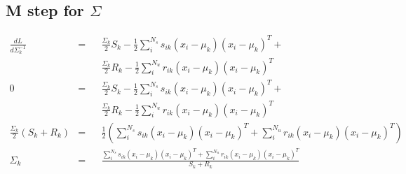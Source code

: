 \documentclass[11pt]{article}
\begin{document}
\subsection{M step for $\Sigma$}
\begin{align}
\frac{dL}{d\Sigma_k^{-1}} &=&& \frac{\Sigma_k}{2}S_k - \frac{1}{2}\sum_i^{N_s}s_{ik}(x_i-\mu_k)(x_i-\mu_k)^T + \\
& &&\frac{\Sigma_k}{2}R_k - \frac{1}{2}\sum_i^{N_u}r_{ik}(x_i-\mu_k)(x_i-\mu_k)^T\\
0 &=&& \frac{\Sigma_k}{2}S_k - \frac{1}{2}\sum_i^{N_s}s_{ik}(x_i-\mu_k)(x_i-\mu_k)^T +\\
& &&\frac{\Sigma_k}{2}R_k - \frac{1}{2}\sum_i^{N_u}r_{ik}(x_i-\mu_k)(x_i-\mu_k)^T\\
\frac{\Sigma_k}{2}(S_k + R_k) &=&& \frac{1}{2}(\sum_i^{N_s}s_{ik}(x_i-\mu_k)(x_i-\mu_k)^T + \sum_i^{N_u}r_{ik}(x_i-\mu_k)(x_i-\mu_k)^T)\\
\Sigma_k &=&& \frac{\sum_i^{N_s}s_{ik}(x_i-\mu_k)(x_i-\mu_k)^T + \sum_i^{N_u}r_{ik}(x_i-\mu_k)(x_i-\mu_k)^T}{S_k+R_k}
\end{align}
\end{document}
